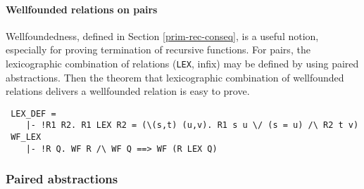 \paragraph {Wellfounded relations on pairs}

Wellfoundedness, defined in Section \ref{prim-rec-conseq},
is a useful notion, especially for proving termination of
recursive functions. For pairs, the lexicographic combination
of relations ({\small\verb+LEX+}, infix) may be defined by using
paired abstractions. Then the theorem that lexicographic combination
of wellfounded relations delivers a wellfounded relation is easy to
prove.
%
\begin{hol}
{\small
\begin{verbatim}
 LEX_DEF =
    |- !R1 R2. R1 LEX R2 = (\(s,t) (u,v). R1 s u \/ (s = u) /\ R2 t v)
 WF_LEX
    |- !R Q. WF R /\ WF Q ==> WF (R LEX Q)
\end{verbatim}
}
\end{hol}

\subsubsection{Paired abstractions}
\label{HOL-varstruct}

